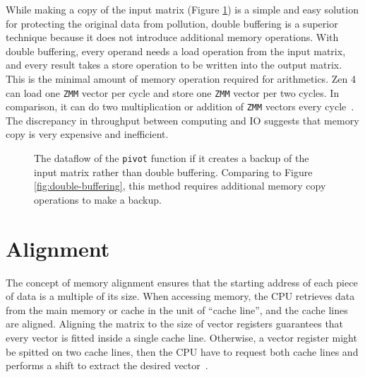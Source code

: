 \documentclass[logo,bsc,singlespacing,parskip]{infthesis}
\newcommand{\pivot}{\texttt{pivot}}
\newcommand{\zmm}{\texttt{ZMM}}
\begin{document}
While making a copy of the input matrix (Figure \ref{fig:single-buffering}) 
is a simple and easy solution for
protecting the original data from pollution, double buffering is a superior
technique because it does not introduce additional memory operations. With
double buffering, every operand needs a load operation from the input matrix,
and every result takes a store operation to be written into the output matrix.
This is the minimal amount of memory operation required for arithmetics. Zen 4
can load one \zmm{} vector per cycle and store one \zmm{} vector per two
cycles. In comparison, it can do two multiplication or addition of \zmm{}
vectors every cycle~\cite{Zen4Critique}. The discrepancy in throughput between computing and IO
suggests that memory copy is very expensive and inefficient. 
\begin{figure}[H]
\centering
{}
\caption{The dataflow of the \pivot{} function if it creates a
backup of the input matrix rather than double buffering. Comparing to 
Figure \ref{fig:double-buffering}, 
this method requires additional memory copy operations to make a backup.}
\label{fig:single-buffering}
\end{figure}
\section{Alignment}


The concept of memory alignment ensures that 
the starting address of each piece of data is a multiple of its size. 
When accessing memory, the CPU retrieves data
from the main memory or cache in the unit of ``cache line'', and the cache lines
are aligned. 
Aligning the matrix to the size of vector registers
guarantees that every vector is fitted inside a single cache line.
Otherwise, a vector register might be spitted on two cache lines, then the CPU
have to request both cache lines and performs a shift to
extract the desired vector~\cite{Unaligned}.  
\end{document}
